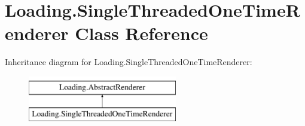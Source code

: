 \hypertarget{class_loading_1_1_single_threaded_one_time_renderer}{}\section{Loading.\+Single\+Threaded\+One\+Time\+Renderer Class Reference}
\label{class_loading_1_1_single_threaded_one_time_renderer}
Inheritance diagram for Loading.\+Single\+Threaded\+One\+Time\+Renderer\+:\begin{figure}[H]
\begin{center}
\leavevmode
\includegraphics[height=2.000000cm]{class_loading_1_1_single_threaded_one_time_renderer}
\end{center}
\end{figure}
